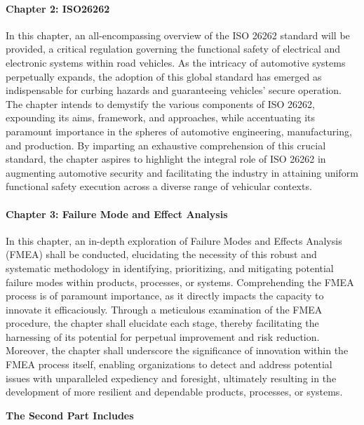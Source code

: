 \documentclass[./dissertation.tex]{subfiles}
\begin{document}
\paragraph{Chapter 2: ISO26262}
In this chapter, an all-encompassing overview of the ISO 26262 standard will be provided, a critical regulation governing the functional safety of electrical and electronic systems within road vehicles. As the intricacy of automotive systems perpetually expands, the adoption of this global standard has emerged as indispensable for curbing hazards and guaranteeing vehicles' secure operation. The chapter intends to demystify the various components of ISO 26262, expounding its aims, framework, and approaches, while accentuating its paramount importance in the spheres of automotive engineering, manufacturing, and production. By imparting an exhaustive comprehension of this crucial standard, the chapter aspires to highlight the integral role of ISO 26262 in augmenting automotive security and facilitating the industry in attaining uniform functional safety execution across a diverse range of vehicular contexts.
\paragraph{Chapter 3: Failure Mode and Effect Analysis}
In this chapter, an in-depth exploration of Failure Modes and Effects Analysis (FMEA) shall be conducted, elucidating the necessity of this robust and systematic methodology in identifying, prioritizing, and mitigating potential failure modes within products, processes, or systems. Comprehending the FMEA process is of paramount importance, as it directly impacts the capacity to innovate it efficaciously. Through a meticulous examination of the FMEA procedure, the chapter shall elucidate each stage, thereby facilitating the harnessing of its potential for perpetual improvement and risk reduction. Moreover, the chapter shall underscore the significance of innovation within the FMEA process itself, enabling organizations to detect and address potential issues with unparalleled expediency and foresight, ultimately resulting in the development of more resilient and dependable products, processes, or systems.


\noindent\textbf{The Second Part Includes}
\end{document}
